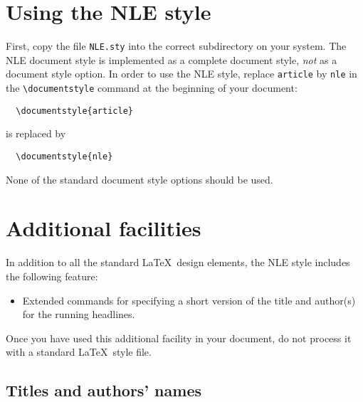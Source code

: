 \documentclass{nle}
\begin{document}
\section{Using the NLE style}

First, copy the file \verb"NLE.sty" into the correct subdirectory on your
system. The NLE document style is implemented as a complete document style,
{\em not\/} as a document style option. In order to use the NLE style,
replace \verb"article" by \verb"nle" in the \verb"\documentstyle" command
at the beginning of your document:
%
\begin{verbatim}
  \documentstyle{article}
\end{verbatim}
%
is replaced by
%
\begin{verbatim}
  \documentstyle{nle}
\end{verbatim}
%
None of the standard document style options should be used.

\section{Additional facilities}

In addition to all the standard \LaTeX\ design elements, the NLE style
includes the following feature:
\begin{itemize}
  \item Extended commands for specifying a short version
        of the title and author(s) for the running
        headlines.
\end{itemize}
Once you have used this additional facility in your document,
do not process it with a standard \LaTeX\ style file.

\subsection{Titles and authors' names}
\end{document}
